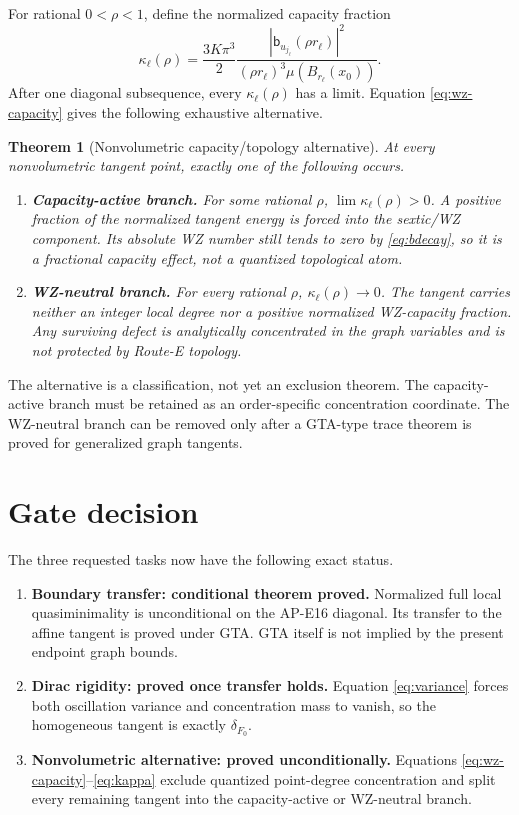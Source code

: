 \documentclass[10pt]{article}
\newtheorem{theorem}{Theorem}[section]
\begin{document}
For rational $0<\rho<1$, define the normalized capacity fraction
\begin{equation}
 \kappa_\ell(\rho)=
 \frac{3K\pi^3}{2}
 \frac{|\mathsf b_{u_{j_\ell}}(\rho r_\ell)|^2}
 {(\rho r_\ell)^3\mu(B_{r_\ell}(x_0))}.                 \label{eq:kappa}
\end{equation}
After one diagonal subsequence, every $\kappa_\ell(\rho)$ has a limit.
Equation \eqref{eq:wz-capacity} gives the following exhaustive alternative.

\begin{theorem}[Nonvolumetric capacity/topology alternative]
At every nonvolumetric tangent point, exactly one of the following occurs.
\begin{enumerate}
 \item \textbf{Capacity-active branch.}  For some rational $\rho$,
 $\lim\kappa_\ell(\rho)>0$.  A positive fraction of the normalized tangent
 energy is forced into the sextic/WZ component.  Its absolute WZ number still
 tends to zero by \eqref{eq:bdecay}, so it is a fractional capacity effect,
 not a quantized topological atom.
 \item \textbf{WZ-neutral branch.}  For every rational $\rho$,
 $\kappa_\ell(\rho)\to0$.  The tangent carries neither an integer local
 degree nor a positive normalized WZ-capacity fraction.  Any surviving
 defect is analytically concentrated in the graph variables and is not
 protected by Route-E topology.
\end{enumerate}
\label{thm:alternative}
\end{theorem}

The alternative is a classification, not yet an exclusion theorem.  The
capacity-active branch must be retained as an order-specific concentration
coordinate.  The WZ-neutral branch can be removed only after a GTA-type
trace theorem is proved for generalized graph tangents.

\section{Gate decision}

The three requested tasks now have the following exact status.
\begin{enumerate}
 \item \textbf{Boundary transfer: conditional theorem proved.}
 Normalized full local quasiminimality is unconditional on the AP-E16
 diagonal.  Its transfer to the affine tangent is proved under GTA.  GTA
 itself is not implied by the present endpoint graph bounds.
 \item \textbf{Dirac rigidity: proved once transfer holds.}
 Equation \eqref{eq:variance} forces both oscillation variance and
 concentration mass to vanish, so the homogeneous tangent is exactly
 $\delta_{F_0}$.
 \item \textbf{Nonvolumetric alternative: proved unconditionally.}
 Equations \eqref{eq:wz-capacity}--\eqref{eq:kappa} exclude quantized
 point-degree concentration and split every remaining tangent into the
 capacity-active or WZ-neutral branch.
\end{enumerate}
\end{document}
